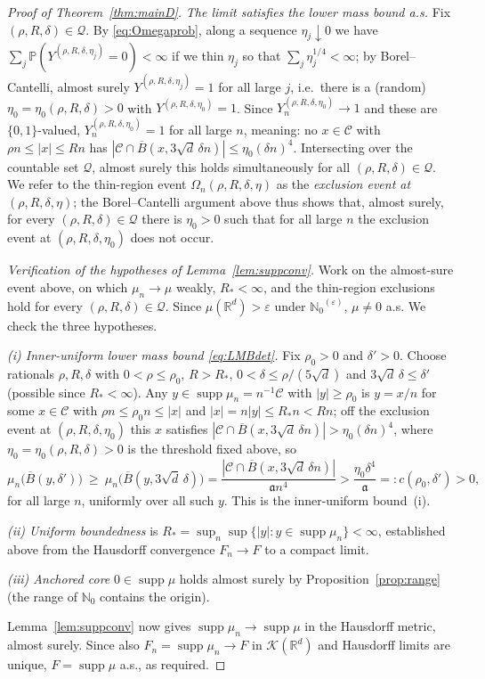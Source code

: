 \documentclass[11pt]{article}
\theoremstyle{definition}
\theoremstyle{remark}
\newcommand{\R}{\mathbb{R}}
\newcommand{\bP}{\mathbb{P}}
\newcommand{\bN}{{\mathbb{N}_0}}                 %
\newcommand{\supp}{\operatorname{supp}}
\newcommand{\eps}{\varepsilon}
\numberwithin{equation}{section}
\theoremstyle{plain}
\theoremstyle{definition}
\theoremstyle{remark}
\theoremstyle{plain}
\begin{document}
\begin{proof}[Proof of Theorem~\ref{thm:mainD}]
\emph{The limit satisfies the lower mass bound a.s.} Fix
$(\rho,R,\delta)\in\mathcal Q$. By \eqref{eq:Omegaprob}, along a sequence
$\eta_j\downarrow0$ we have $\sum_j\bP(Y^{(\rho,R,\delta,\eta_j)}=0)<\infty$ if
we thin $\eta_j$ so that $\sum_j\eta_j^{1/4}<\infty$; by Borel--Cantelli,
almost surely $Y^{(\rho,R,\delta,\eta_j)}=1$ for all large $j$, i.e.\ there is
a (random) $\eta_0=\eta_0(\rho,R,\delta)>0$ with
$Y^{(\rho,R,\delta,\eta_0)}=1$. Since $Y_n^{(\rho,R,\delta,\eta_0)}\to1$ and
these are $\{0,1\}$-valued, $Y_n^{(\rho,R,\delta,\eta_0)}=1$ for all large $n$,
meaning: no $x\in \mathcal C$ with $\rho n\le|x|\le Rn$ has
$|\mathcal C\cap \overline B(x,3\sqrt d\,\delta n)|\le\eta_0(\delta n)^4$. Intersecting over the
countable set $\mathcal Q$, almost surely this holds simultaneously for all
$(\rho,R,\delta)\in\mathcal Q$. We refer to the thin-region event $\Omega_n(\rho,R,\delta,\eta)$ as the
\emph{exclusion event at} $(\rho,R,\delta,\eta)$; the Borel--Cantelli argument
above thus shows that, almost surely, for every $(\rho,R,\delta)\in\mathcal Q$
there is $\eta_0>0$ such that for all large $n$ the exclusion event at
$(\rho,R,\delta,\eta_0)$ does not occur.

\emph{Verification of the hypotheses of Lemma~\ref{lem:suppconv}.} Work
on the almost-sure event above, on which $\mu_n\to\mu$ weakly,
$R_\ast<\infty$, and the thin-region exclusions hold for every
$(\rho,R,\delta)\in\mathcal Q$. Since $\mu(\R^d)>\eps$ under
$\bN^{(\eps)}$, $\mu\neq0$ a.s. We check the three hypotheses.

\emph{(i) Inner-uniform lower mass bound \eqref{eq:LMBdet}.} Fix
$\rho_0>0$ and $\delta'>0$. Choose rationals $\rho,R,\delta$ with
$0<\rho\le\rho_0$, $R>R_\ast$, $0<\delta\le\rho/(5\sqrt d)$ and
$3\sqrt d\,\delta\le\delta'$
(possible since $R_\ast<\infty$). Any $y\in\supp\mu_n=n^{-1}\mathcal C$ with
$|y|\ge\rho_0$ is $y=x/n$ for some $x\in \mathcal C$ with $\rho n\le\rho_0 n\le|x|$
and $|x|=n|y|\le R_\ast n<Rn$; off the exclusion event at
$(\rho,R,\delta,\eta_0)$ this $x$ satisfies $|\mathcal C\cap \overline B(x,3\sqrt d\,\delta n)|>\eta_0(\delta n)^4$, where $\eta_0=\eta_0(\rho,R,\delta)>0$ is the threshold fixed above, so
\[
\mu_n\bigl(\overline B(y,\delta')\bigr)\ \ge\
\mu_n\bigl(\overline B(y,3\sqrt d\,\delta)\bigr)
=\frac{|\mathcal C\cap \overline B(x,3\sqrt d\,\delta n)|}{\mathfrak a n^4}
>\frac{\eta_0\delta^4}{\mathfrak a}{}=:c(\rho_0,\delta')>0,
\]
for all large $n$, uniformly over all such $y$. This is the inner-uniform
bound~(i).

\emph{(ii) Uniform boundedness} is $R_\ast=\sup_n\sup\{|y|:y\in
\supp\mu_n\}<\infty$, established above from the Hausdorff convergence
$F_n\to F$ to a compact limit.

\emph{(iii) Anchored core} $0\in\supp\mu$ holds almost surely by
Proposition~\ref{prop:range} (the range of $\bN$ contains the origin).

Lemma~\ref{lem:suppconv} now gives $\supp\mu_n\to\supp\mu$ in the
Hausdorff metric, almost surely. Since also $F_n=\supp\mu_n\to F$ in
$\mathcal K(\R^d)$ and Hausdorff limits are unique, $F=\supp\mu$ a.s., as
required.
\end{proof}
\end{document}
